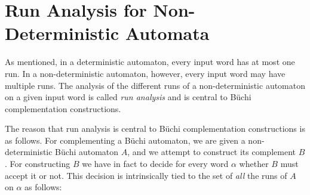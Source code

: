 




\section{Run Analysis for Non-Deterministic Automata}
\label{2_run_analysis}
As mentioned, in a deterministic automaton, every input word has at most one run. In a non-deterministic automaton, however, every input word may have multiple runs. The analysis of the different runs of a non-deterministic automaton on a given input word is called \textit{run analysis} and is central to Büchi complementation constructions.

The reason that run analysis is central to Büchi complementation constructions is as follows. For complementing a Büchi automaton, we are given a non-deterministic Büchi automaton $A$, and we attempt to construct its complement $B$. For constructing $B$ we have in fact to decide for every word $\alpha$ whether $B$ must accept it or not. This decision is intrinsically tied to the set of \textit{all} the runs of $A$ on $\alpha$ as follows:

